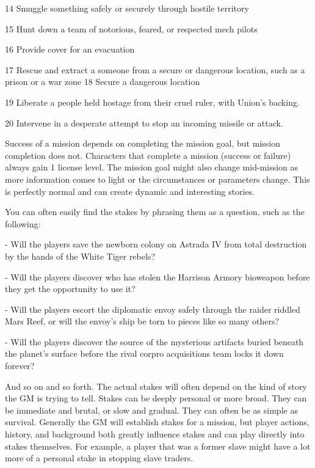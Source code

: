   14       Smuggle something safely or securely through hostile territory

  15       Hunt down a team of notorious, feared, or respected mech pilots

  16       Provide cover for an evacuation

  17       Rescue and extract a someone from a secure or dangerous location, such as a prison
           or a war zone
  18       Secure a dangerous location

  19       Liberate a people held hostage from their cruel ruler, with Union’s backing.

  20       Intervene in a desperate attempt to stop an incoming missile or attack.

Success of a mission depends on completing the mission goal, but mission completion does
not. Characters that complete a mission (success or failure) always gain 1 license level. The
mission goal might also change mid-mission as more information comes to light or the
circumstances or parameters change. This is perfectly normal and can create dynamic and
interesting stories.





You can often easily find the stakes by phrasing them as a question, such as the following:

     -   Will the players save the newborn colony on Astrada IV from total destruction by the
         hands of the White Tiger rebels?

     -   Will the players discover who has stolen the Harrison Armory bioweapon before they get
         the opportunity to use it?

     -   Will the players escort the diplomatic envoy safely through the raider riddled Mars Reef,
         or will the envoy’s ship be torn to pieces like so many others?

     -   Will the players discover the source of the mysterious artifacts buried beneath the
         planet’s surface before the rival corpro acquisitions team locks it down forever?


And so on and so forth. The actual stakes will often depend on the kind of story the GM is trying
to tell. Stakes can be deeply personal or more broad. They can be immediate and brutal, or slow
and gradual. They can often be as simple as survival. Generally the GM will establish stakes for a
mission, but player actions, history, and background both greatly influence stakes and can play
directly into stakes themselves. For example, a player that was a former slave might have a lot
more of a personal stake in stopping slave traders.


